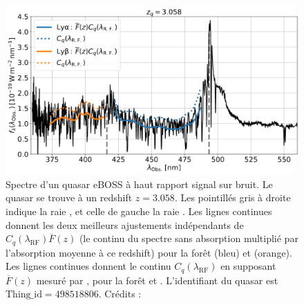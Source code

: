 \begin{figure}
  \centering
  \includegraphics[scale=0.35]{foret_lya}
  \caption{Spectre d'un quasar eBOSS à haut rapport signal sur bruit. Le quasar se trouve à un redshift $z=3.058$.
    Les pointillés gris à droite indique la raie \lya{}, et celle de gauche la raie \lyb{}.
    Les lignes continues donnent les deux meilleurs ajustements indépendants de $C_{q}(\lambda_{\mathrm{RF}})\overline F(z)$ (le continu du spectre sans absorption multiplié par l'absorption moyenne à ce redshift) pour la forêt \lya (bleu) et \lyb{} (orange).
    Les lignes continues donnent le continu $C_{q}(\lambda_{\mathrm{RF}})$ en supposant $\overline F(z)$ mesuré par \textcite{Calura2012}, pour la forêt \lya{} et \lyb{}. L'identifiant du quasar est $\mathrm{Thing\_id} = 498518806$.
  Crédits : \textcite{DuMasdesBourboux2020}}
  \label{fig:foret_lya}
\end{figure}
